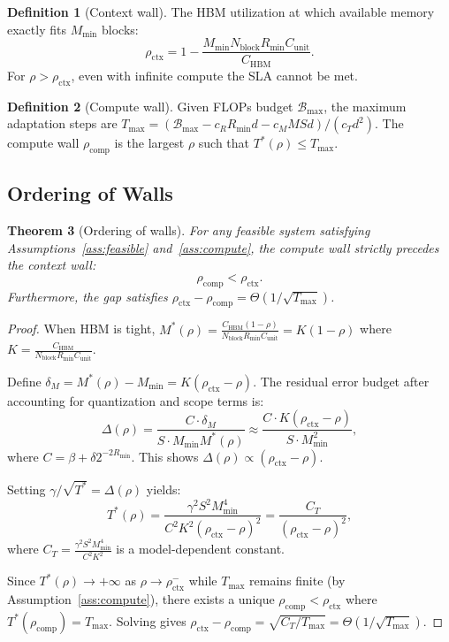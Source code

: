 \documentclass[11pt,a4paper]{article}
\theoremstyle{plain}
\newtheorem{theorem}{Theorem}[section]
\theoremstyle{definition}
\newtheorem{definition}[theorem]{Definition}
\begin{document}
\begin{definition}[Context wall]
The HBM utilization at which available memory exactly fits $M_{\min}$ blocks:
\begin{equation}
\rho_{\text{ctx}} = 1 - \frac{M_{\min} N_{\text{block}} R_{\min} C_{\text{unit}}}{C_{\text{HBM}}}. \label{eq:ctxwall}
\end{equation}
For $\rho > \rho_{\text{ctx}}$, even with infinite compute the SLA cannot be met.
\end{definition}

\begin{definition}[Compute wall]
Given FLOPs budget $\mathcal{B}_{\max}$, the maximum adaptation steps are $T_{\max} = (\mathcal{B}_{\max} - c_R R_{\min} d - c_M M S d)/(c_T d^2)$. The compute wall $\rho_{\text{comp}}$ is the largest $\rho$ such that $T^*(\rho) \leq T_{\max}$.
\end{definition}

\subsection{Ordering of Walls}
\begin{theorem}[Ordering of walls]\label{thm:ordering}
For any feasible system satisfying Assumptions~\ref{ass:feasible} and~\ref{ass:compute}, the compute wall strictly precedes the context wall:
\[
\rho_{\text{comp}} < \rho_{\text{ctx}}.
\]
Furthermore, the gap satisfies $\rho_{\text{ctx}} - \rho_{\text{comp}} = \Theta(1/\sqrt{T_{\max}})$.
\end{theorem}

\begin{proof}
When HBM is tight, $M^*(\rho) = \frac{C_{\text{HBM}}(1-\rho)}{N_{\text{block}} R_{\min} C_{\text{unit}}} = K(1-\rho)$ where $K = \frac{C_{\text{HBM}}}{N_{\text{block}} R_{\min} C_{\text{unit}}}$.

Define $\delta_M = M^*(\rho) - M_{\min} = K(\rho_{\text{ctx}} - \rho)$. The residual error budget after accounting for quantization and scope terms is:
\[
\Delta(\rho) = \frac{C \cdot \delta_M}{S \cdot M_{\min} M^*(\rho)} \approx \frac{C \cdot K (\rho_{\text{ctx}} - \rho)}{S \cdot M_{\min}^2},
\]
where $C = \beta + \delta 2^{-2R_{\min}}$. This shows $\Delta(\rho) \propto (\rho_{\text{ctx}} - \rho)$.

Setting $\gamma/\sqrt{T^*} = \Delta(\rho)$ yields:
\[
T^*(\rho) = \frac{\gamma^2 S^2 M_{\min}^4}{C^2 K^2 (\rho_{\text{ctx}} - \rho)^2} = \frac{C_T}{(\rho_{\text{ctx}} - \rho)^2},
\]
where $C_T = \frac{\gamma^2 S^2 M_{\min}^4}{C^2 K^2}$ is a model-dependent constant.

Since $T^*(\rho) \to +\infty$ as $\rho \to \rho_{\text{ctx}}^-$ while $T_{\max}$ remains finite (by Assumption~\ref{ass:compute}), there exists a unique $\rho_{\text{comp}} < \rho_{\text{ctx}}$ where $T^*(\rho_{\text{comp}}) = T_{\max}$. Solving gives $\rho_{\text{ctx}} - \rho_{\text{comp}} = \sqrt{C_T/T_{\max}} = \Theta(1/\sqrt{T_{\max}})$.
\end{proof}
\end{document}
